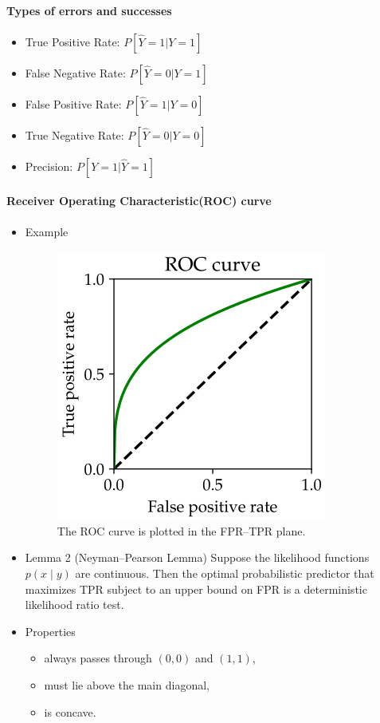 \documentclass[a4paper]{article}
\begin{document}
\paragraph{Types of errors and successes}
\begin{itemize}
    \item True Positive Rate: $P[\hat{Y} = 1| Y=1]$
    \item False Negative Rate: $P[\hat{Y} = 0| Y=1]$
    \item False Positive Rate: $P[\hat{Y} = 1| Y=0]$
    \item True Negative Rate: $P[\hat{Y} = 0| Y=0]$
    \item Precision: $P[Y = 1| \hat{Y}=1]$
\end{itemize}

\paragraph{Receiver Operating Characteristic(ROC) curve}

\begin{itemize}
    \item Example
    \begin{figure} [H]
        \centering
        \includegraphics[width=0.5\linewidth]{image/roc.png}
        \caption{The ROC curve is plotted in the FPR–TPR plane.}
    \end{figure}
    \item Lemma 2 (Neyman–Pearson Lemma)
Suppose the likelihood functions $p(x \mid y)$ are continuous. Then the optimal probabilistic predictor that maximizes TPR subject to an upper bound on FPR is a deterministic likelihood ratio test.
    \item Properties
        \begin{itemize}
            \item always passes through $(0,0)$ and $(1,1)$,
            \item must lie above the main diagonal,
            \item is concave.
        \end{itemize}
\end{itemize}
\end{document}

